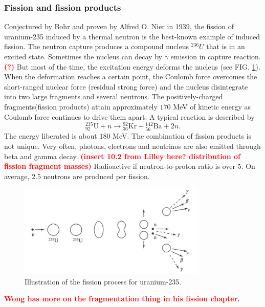 \documentclass[preprint,aip,pra]{revtex4-1}
\newcommand{\red}[1]{\textcolor{red}{\bf #1}}
\begin{document}
        \subsubsection{Fission and fission products}
        Conjectured by Bohr and proven by Alfred O. Nier in 1939,
        the fission of uranium-235 induced by a thermal neutron
        is the best-known example of induced fission. 
        The neutron capture produces a compound nucleus ${}^{236}U$ that is in an excited state.
        Sometimes the nucleus can decay by $\gamma$ emission in capture reaction. \red{(?)}
        But most of the time, the excitation energy deforms the nucleus (see FIG. \ref{fig:fission}).
        When the
        deformation reaches a certain point, the Coulomb force overcomes the short-ranged nuclear
        force (residual strong force) and the nucleus disintegrate into two large fragments and several neutrons. The
        positively-charged fragments(fission products) attain approximately $170$ MeV of kinetic energy as
        Coulomb force continues to drive them apart.\cite{l01}
        A typical reaction is described by
        \[{}^{235}_{92}\text{U} + n \rightarrow {}^{92}_{36}\text{Kr} + {}^{142}_{56}\text{Ba} + 2 n.\]
        The energy liberated is about $180$ MeV. The combination of fission products is not
        unique. \cite{w98, gc01}
        Very often, photons, electrons and neutrinos are also emitted through beta and gamma decay.
        \red{(insert 10.2 from Lilley here? distribution of fission fragment masses)}
        Radioactive if neutron-to-proton ratio is over 5. On average, $2.5$ neutrons are produced per fission.\cite{l01} 
        \begin{figure}[h]
            \centering
            \includegraphics[width=0.8\textwidth]{fission.png}
            \caption{Illustration of the fission process for uranium-235.\cite{l01}}
            \label{fig:fission}
        \end{figure}

        \red{Wong has more on the fragmentation thing in his fission chapter.}
\end{document}
